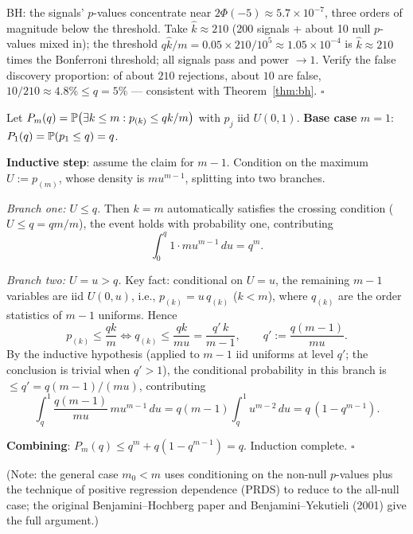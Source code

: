 \begin{description}[style=nextline, itemsep=1.2ex]
BH: the signals' $p$-values concentrate near $2\Phi(-5) \approx 5.7\times 10^{-7}$, three orders of magnitude below the threshold. Take $\hat{k} \approx 210$ (200 signals + about 10 null $p$-values mixed in); the threshold $q\hat{k}/m = 0.05 \times 210 / 10^5 \approx 1.05 \times 10^{-4}$ is $\hat{k} \approx 210$ times the Bonferroni threshold; all signals pass and power $\to 1$. Verify the false discovery proportion: of about $210$ rejections, about $10$ are false, $10/210 \approx 4.8\% \le q = 5\%$ --- consistent with Theorem~\ref{thm:bh}. $\square$

\item[Exercise \ref{ex:bh-proof} (induction proof of $\mathrm{FDR} \le q$ under the all-null independent case)]
Let $P_m(q) = \mathbb{P}\big( \exists k \le m : p_{(k)} \le qk/m \big)$ with $p_j$ iid $U(0,1)$. \textbf{Base case} $m=1$: $P_1(q) = \mathbb{P}(p_1 \le q) = q$.

\textbf{Inductive step}: assume the claim for $m-1$. Condition on the maximum $U := p_{(m)}$, whose density is $m u^{m-1}$, splitting into two branches.

\textit{Branch one: $U \le q$.} Then $k=m$ automatically satisfies the crossing condition ($U \le q = qm/m$), the event holds with probability one, contributing
\[
  \int_0^q 1 \cdot m u^{m-1}\, du = q^{m}.
\]

\textit{Branch two: $U = u > q$.} Key fact: conditional on $U = u$, the remaining $m-1$ variables are iid $U(0, u)$, i.e., $p_{(k)} = u\, q_{(k)}$ ($k < m$), where $q_{(k)}$ are the order statistics of $m-1$ uniforms. Hence
\[
  p_{(k)} \le \frac{qk}{m}
  \iff q_{(k)} \le \frac{q k}{m u}
  = \frac{q'\, k}{m-1},
  \qquad q' := \frac{q(m-1)}{m u}.
\]
By the inductive hypothesis (applied to $m-1$ iid uniforms at level $q'$; the conclusion is trivial when $q' > 1$), the conditional probability in this branch is $\le q' = q(m-1)/(mu)$, contributing
\[
  \int_q^1 \frac{q(m-1)}{m u}\, m u^{m-1}\, du
  = q(m-1) \int_q^1 u^{m-2}\, du
  = q\,(1 - q^{m-1}).
\]

\textbf{Combining}: $P_m(q) \le q^m + q(1 - q^{m-1}) = q$. Induction complete. $\square$

(Note: the general case $m_0 < m$ uses conditioning on the non-null $p$-values plus the technique of positive regression dependence (PRDS) to reduce to the all-null case; the original Benjamini--Hochberg paper and Benjamini--Yekutieli (2001) give the full argument.)


\end{description}
